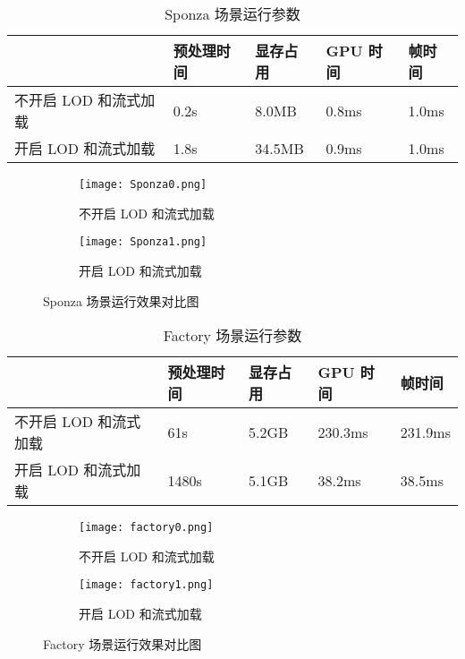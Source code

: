 \begin{table}[H]
    \caption{\label{tab:Sponza data}Sponza 场景运行参数}
    \begin{tabularx}{\linewidth}{|X<{\centering}|X<{\centering}|X<{\centering}|X<{\centering}|X<{\centering}|}
        \hline
        ~ & 预处理时间 & 显存占用 & GPU 时间 & 帧时间 \\ \hline
        不开启 LOD 和流式加载 & 0.2s & 8.0MB & 0.8ms & 1.0ms \\ \hline
        开启 LOD 和流式加载 & 1.8s & 34.5MB & 0.9ms & 1.0ms \\ \hline
    \end{tabularx}
\end{table}

\begin{figure*}[htbp]
    \centering
    \begin{subfigure}[b]{0.48\linewidth}
        \centering
        \texttt{[image: Sponza0.png]}
        \caption{不开启 LOD 和流式加载}
    \end{subfigure}%
    \hfill %
    \begin{subfigure}[b]{0.48\linewidth}
        \centering
        \texttt{[image: Sponza1.png]}
        \caption{开启 LOD 和流式加载}
    \end{subfigure}%
    \caption{Sponza 场景运行效果对比图}
    \vspace{-0.2cm}
    \label{fig:Sponza fig}
\end{figure*}

\begin{table}[H]
    \caption{\label{tab:Factory data}Factory 场景运行参数}
    \begin{tabularx}{\linewidth}{|X<{\centering}|X<{\centering}|X<{\centering}|X<{\centering}|X<{\centering}|}
        \hline
        ~ & 预处理时间 & 显存占用 & GPU 时间 & 帧时间 \\ \hline
        不开启 LOD 和流式加载 & 61s & 5.2GB & 230.3ms & 231.9ms \\ \hline
        开启 LOD 和流式加载 & 1480s & 5.1GB & 38.2ms & 38.5ms \\ \hline
    \end{tabularx}
\end{table}

\begin{figure*}[htbp]
    \centering
    \begin{subfigure}[b]{0.48\linewidth}
        \centering
        \texttt{[image: factory0.png]}
        \caption{不开启 LOD 和流式加载}
    \end{subfigure}%
    \hfill %
    \begin{subfigure}[b]{0.48\linewidth}
        \centering
        \texttt{[image: factory1.png]}
        \caption{开启 LOD 和流式加载}
    \end{subfigure}%
    \caption{Factory 场景运行效果对比图}
    \vspace{-0.2cm}
    \label{fig:Factory fig}
\end{figure*}

